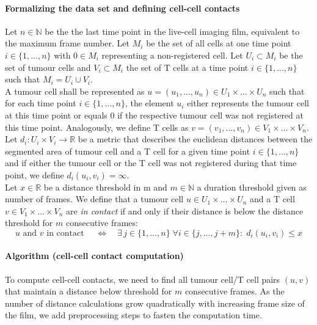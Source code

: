 \documentclass{report}
\begin{document}
\paragraph{Formalizing the data set and defining cell-cell contacts} 
Let $n \in \mathbb{N}$ be the the last time point in the live-cell imaging film, equivalent to the maximum frame number. 
Let $M_i$ be the set of all cells at one time point $i \in \{1, \dots, n\}$ with $0 \in M_i$ representing a non-registered cell. Let $U_i \subset M_i$ be the set of tumour cells and $V_i \subset M_i$ the set of T cells at a time point $i \in \{1, \dots, n\}$ such that $M_i = U_i \cup V_i$. \\

A tumour cell shall be represented as $u = (u_1, \dots, u_n) \in U_1 \times \dots \times U_n$ such that for each time point $i \in \{1, \dots, n\}$, the element $u_i$  either represents the tumour cell at this time point or equals $0$ if the respective tumour cell was not registered at this time point. Analogously, we define T cells as $v = (v_1, \dots, v_n) \in V_1 \times \dots \times V_n$.\\

Let $d_i: U_i \times V_i \to \mathbb{R}$ be a metric that describes the euclidean distances between the segmented area of tumour cell and a T cell for a given time point $i \in \{1, \dots,n\}$ and if either the tumour cell or the T cell was not registered during that time point, we define $d_i(u_i, v_i) = \infty$.\\

Let $x \in \mathbb{R}$ be a distance threshold in \textmu m and $m \in \mathbb{N}$ a duration threshold given as number of frames. We define that a tumour cell $u \in U_1 \times \dots \times U_n$ and a T cell $v \in V_1 \times \dots \times V_n$ are \textit{in contact} if and only if their distance is below the distance threshold for $m$ consecutive frames:
\begin{equation*}
	u \text{ and } v \text{ in contact } 
		\quad \Leftrightarrow \quad 
		\exists \, j \in \{1, \dots, n\} \;
		\forall i \in \{j, \dots, j+m\}: \;
	 	d_i(u_i, v_i) \le x
\end{equation*}

\paragraph{Algorithm (cell-cell contact computation)} To compute cell-cell contacts, we need to find all tumour cell/T cell pairs $(u,v)$ that maintain a distance below threshold for $m$ consecutive frames. As the number of distance calculations grow quadratically with increasing frame size of the film, we add preprocessing steps to fasten the computation time.\\
\end{document}
